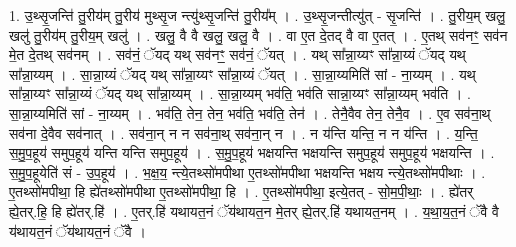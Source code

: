 \documentclass[17pt]{extarticle}
\begin{document}
1. उ॒थ्सृ॒जन्ति॑ तु॒रीय॑म् तु॒रीय॑ मुथ्सृ॒ज न्त्यु॑थ्सृ॒जन्ति॑ तु॒रीय᳚म् । . उ॒थ्सृ॒जन्तीत्यु॑त् - सृ॒जन्ति॑ । . तु॒रीय॒म् खलु॒ खलु॑ तु॒रीय॑म् तु॒रीय॒म् खलु॑ । . खलु॒ वै वै खलु॒ खलु॒ वै । . वा ए॒त दे॒तद् वै वा ए॒तत् । . ए॒तथ् सव॑नꣳ॒॒ सव॑न मे॒त दे॒तथ् सव॑नम् । . सव॑नं॒ ॅयद् यथ् सव॑नꣳ॒॒ सव॑नं॒ ॅयत् । . यथ् सा᳚न्ना॒य्यꣳ सा᳚न्ना॒य्यं ॅयद् यथ् सा᳚न्ना॒य्यम् । . सा॒न्ना॒य्यं ॅयद् यथ् सा᳚न्ना॒य्यꣳ सा᳚न्ना॒य्यं ॅयत् । . सा॒न्ना॒य्यमिति॑ सां - ना॒य्यम् । . यथ् सा᳚न्ना॒य्यꣳ सा᳚न्ना॒य्यं ॅयद् यथ् सा᳚न्ना॒य्यम् । . सा॒न्ना॒य्यम् भव॑ति॒ भव॑ति सान्ना॒य्यꣳ सा᳚न्ना॒य्यम् भव॑ति । . सा॒न्ना॒य्यमिति॑ सां - ना॒य्यम् । . भव॑ति॒ तेन॒ तेन॒ भव॑ति॒ भव॑ति॒ तेन॑ । . तेनै॒वैव तेन॒ तेनै॒व । . ए॒व सव॑ना॒थ् सव॑ना दे॒वैव सव॑नात् । . सव॑ना॒न् न न सव॑ना॒थ् सव॑ना॒न् न । . न य॑न्ति यन्ति॒ न न य॑न्ति । . य॒न्ति॒ स॒मु॒प॒हूय॑ समुप॒हूय॑ यन्ति यन्ति समुप॒हूय॑ । . स॒मु॒प॒हूय॑ भक्षयन्ति भक्षयन्ति समुप॒हूय॑ समुप॒हूय॑ भक्षयन्ति । . स॒मु॒प॒हूयेति॑ सं - उ॒प॒हूय॑ । . भ॒क्ष॒य॒ न्त्ये॒तथ्सो॑मपीथा ए॒तथ्सो॑मपीथा भक्षयन्ति भक्षय न्त्ये॒तथ्सो॑मपीथाः । . ए॒तथ्सो॑मपीथा॒ हि ह्ये॑तथ्सो॑मपीथा ए॒तथ्सो॑मपीथा॒ हि । . ए॒तथ्सो॑मपीथा॒ इत्ये॒तत् - सो॒म॒पी॒थाः॒ । . ह्ये॑तर् ह्ये॒तर्.हि॒ हि ह्ये॑तर्.हि॑ । . ए॒तर्.हि॑ यथायत॒नं ॅय॑थायत॒न मे॒तर् ह्ये॒तर्.हि॑ यथायत॒नम् । . य॒था॒य॒त॒नं ॅवै वै य॑थायत॒नं ॅय॑थायत॒नं ॅवै । \newline
\end{document}
